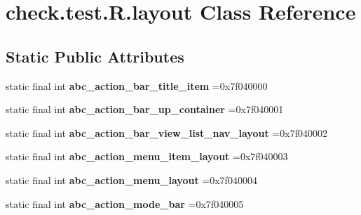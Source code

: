 \hypertarget{classcheck_1_1test_1_1_r_1_1layout}{}\section{check.\+test.\+R.\+layout Class Reference}
\label{classcheck_1_1test_1_1_r_1_1layout}
\subsection*{Static Public Attributes}
\begin{DoxyCompactItemize}
\item 
\hypertarget{classcheck_1_1test_1_1_r_1_1layout_a8ec106402a43e17b70212e29cc51c9d5}{}static final int {\bfseries abc\+\_\+action\+\_\+bar\+\_\+title\+\_\+item} =0x7f040000\label{classcheck_1_1test_1_1_r_1_1layout_a8ec106402a43e17b70212e29cc51c9d5}

\item 
\hypertarget{classcheck_1_1test_1_1_r_1_1layout_aa35c6f8d6fbecb81ebce7267a5481410}{}static final int {\bfseries abc\+\_\+action\+\_\+bar\+\_\+up\+\_\+container} =0x7f040001\label{classcheck_1_1test_1_1_r_1_1layout_aa35c6f8d6fbecb81ebce7267a5481410}

\item 
\hypertarget{classcheck_1_1test_1_1_r_1_1layout_a5e540168f3fd0475fec521ca553e95c8}{}static final int {\bfseries abc\+\_\+action\+\_\+bar\+\_\+view\+\_\+list\+\_\+nav\+\_\+layout} =0x7f040002\label{classcheck_1_1test_1_1_r_1_1layout_a5e540168f3fd0475fec521ca553e95c8}

\item 
\hypertarget{classcheck_1_1test_1_1_r_1_1layout_abcbc47e8059f868d64f8d14c174eebcb}{}static final int {\bfseries abc\+\_\+action\+\_\+menu\+\_\+item\+\_\+layout} =0x7f040003\label{classcheck_1_1test_1_1_r_1_1layout_abcbc47e8059f868d64f8d14c174eebcb}

\item 
\hypertarget{classcheck_1_1test_1_1_r_1_1layout_ac6e2b705494569aec50b1a2eb2003b48}{}static final int {\bfseries abc\+\_\+action\+\_\+menu\+\_\+layout} =0x7f040004\label{classcheck_1_1test_1_1_r_1_1layout_ac6e2b705494569aec50b1a2eb2003b48}

\item 
\hypertarget{classcheck_1_1test_1_1_r_1_1layout_ae3bc1c44f5b31011ba917c940a6aaa81}{}static final int {\bfseries abc\+\_\+action\+\_\+mode\+\_\+bar} =0x7f040005\label{classcheck_1_1test_1_1_r_1_1layout_ae3bc1c44f5b31011ba917c940a6aaa81}


\end{DoxyCompactItemize}
